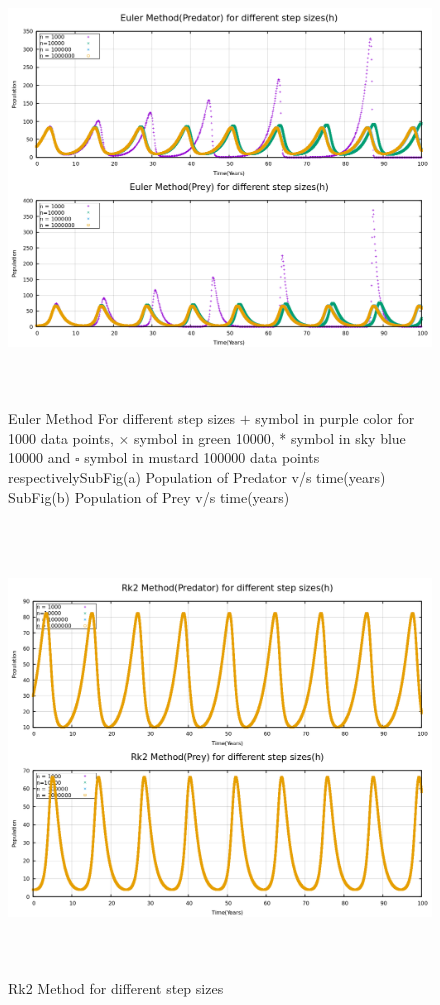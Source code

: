\documentclass[12pt]{article}
\begin{document}
\begin{figure}[h] %
    \centering
    \includegraphics[width=15cm,height=12cm]{euler_diff_h.png}
\caption{Euler Method For different step sizes $+$ symbol in purple color for 1000 data points, $\times$ symbol in green 10000, * symbol in sky blue 10000 and $\square$ symbol in mustard 100000 data points respectively\newline SubFig(a) Population of Predator v/s time(years) \newline SubFig(b) Population of Prey v/s time(years) }
\end{figure}

\newpage
\begin{figure}[h] %
    \centering
    \includegraphics[width=15cm,height=12cm]{rk2_diff_h.png}
\caption{Rk2 Method for different step sizes}
\end{figure}
\end{document}
